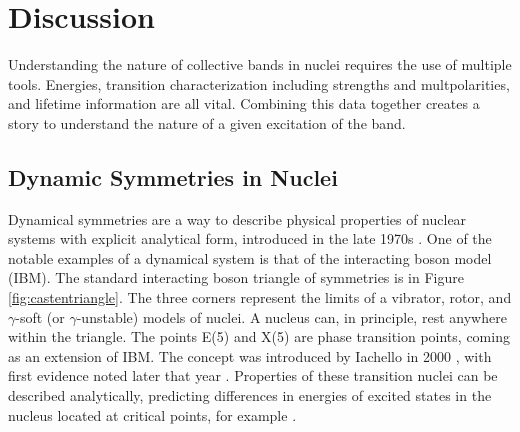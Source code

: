 %
%
%
%
%
%
%
%
%
%


%
%

\chapter{Discussion}

Understanding the nature of collective bands in nuclei requires the use of multiple tools. Energies, transition characterization including strengths and multpolarities, and lifetime information are all vital. Combining this data together creates a story to understand the nature of a given excitation of the band.

\section{Dynamic Symmetries in Nuclei}

Dynamical symmetries are a way to describe physical properties of nuclear systems with explicit analytical form, introduced in the late 1970s \citep{vanisacker99:_symmetries}. One of the notable examples of a dynamical system is that of the interacting boson model (IBM). The standard interacting boson triangle of symmetries is in Figure \ref{fig:castentriangle}. The three corners represent the limits of a vibrator, rotor, and $\gamma$-soft (or $\gamma$-unstable) models of nuclei. A nucleus can, in principle, rest anywhere within the triangle. The points E(5) and X(5) are phase transition points, coming as an extension of IBM. The concept was introduced by Iachello in 2000 \citep{iachello00:_x5}, with first evidence noted later that year \citep{casten00:_x5}. Properties of these transition nuclei can be described analytically, predicting differences in energies of excited states in the nucleus located at critical points, for example \citep{iachello01:_x5}.


